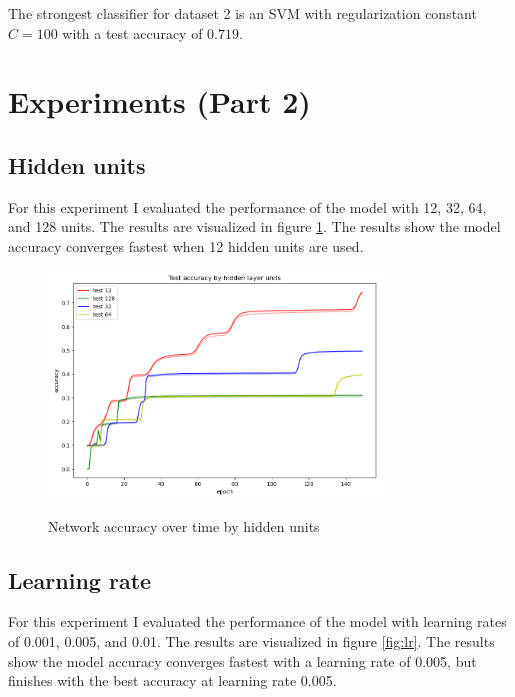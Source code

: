 \documentclass{article}
\begin{document}
The strongest classifier for dataset 2 is an SVM with regularization constant $C=100$ with a test accuracy of $0.719$.

\section{Experiments (Part 2)}

\subsection{Hidden units}
For this experiment I evaluated the performance of the model with 12, 32, 64, and 128 units. The results are visualized in figure \ref{fig:units}. The results show the model accuracy converges fastest when 12 hidden units are used.

\begin{figure}[H]
    \centering
    \includegraphics[width=0.8\textwidth]{part2/experiments/units/units.png}
    \label{fig:units}
    \caption{Network accuracy over time by hidden units}
\end{figure}

\subsection{Learning rate}
For this experiment I evaluated the performance of the model with learning rates of 0.001, 0.005, and 0.01. The results are visualized in figure \ref{fig:lr}. The results show the model accuracy converges fastest with a learning rate of 0.005, but finishes with the best accuracy at learning rate 0.005.
\end{document}
